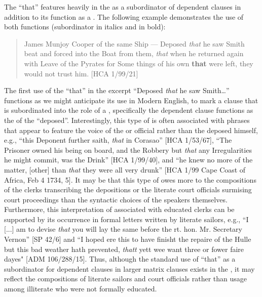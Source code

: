 The  “that” features heavily in the  as a subordinator of dependent clauses in addition to its function as a . The following example demonstrates the use of both functions (subordinator in italics and  in bold):

\begin{quotation}
James Munjoy Cooper of the same Ship — Deposed \textit{that} he saw Smith beat and forced into the Boat from them, \textit{that} when he returned again with Leave of the Pyrates for Some things of his own \textbf{that} were left, they would not trust him. [HCA 1/99/21]\end{quotation}

The first use of the  “that” in the excerpt “Deposed \textit{that} he saw Smith…” functions as we might anticipate its use in Modern English, to mark a clause that is subordinated into the role of a , specifically the dependent clause functions as the  of the  “deposed”.  Interestingly, this type of  is often associated with phrases that appear to feature the voice of the  or official rather than the deposed  himself, e.g., “this Deponent further saith, \textit{that} in Corasao” [HCA 1/53/67], “The Prisoner owned his being on board, and the Robbery but \textit{that} any Irregularities he might commit, was the Drink” [HCA 1/99/40], and “he knew no more of the matter, [other] than \textit{that} they were all very drunk” [HCA 1/99 Cape Coast of Africa, Feb 4 1734, 5]. It may be that this type of  owes more to the compositions of the clerks transcribing the depositions or the literate court officials surmising court proceedings than the syntactic choices of the speakers themselves. Furthermore, this interpretation of  associated with educated clerks can be supported by its occurrence in formal letters written by literate sailors, e.g., “I [...] am to devise \textit{that} you will lay the same before the rt. hon. Mr. Secretary Vernon” [SP 42/6] and “I hoped ere this to have finisht the repaire of the Hulle but this bad weather hath prevented, \textit{thatt} yett wee want three or fower faire dayes" [ADM 106/288/15]. Thus, although the standard use of “that” as a subordinator for dependent clauses in larger matrix clauses exists in the , it may reflect the compositions of literate sailors and court officials rather than usage among illiterate  who were not formally educated. 

